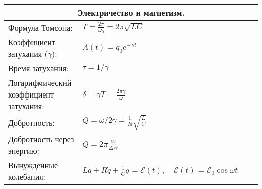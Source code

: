 \documentclass{article}
\begin{document}
\begin{tabular}{ |p{6cm}|p{3cm}|p{6cm}|p{3.5cm}|  }
\hline
\multicolumn{4}{|c|}{Электричество и магнетизм.} \\
\hline
Формула Томсона:                                                           &
$T=\frac{2 \pi}{\omega_{0}}=2 \pi \sqrt{L C}$                              &
                                                                           &
                                                                           \\
\hline
Коэффициент затухания ($\gamma$):                                          &
$A(t)=q_{0} e^{-\gamma t}$                                                 &
                                                                           &
                                                                           \\
\hline
Время затухания:                                                           &
$\tau=1 / \gamma$                                                          &
                                                                           &
                                                                           \\
\hline
Логарифмический коэффициент затухания:                                     &
$\delta=\gamma T=\frac{2 \pi \gamma}{\omega}$                              &
                                                                           &
                                                                           \\
\hline
Добротность:                                                               &
$Q=\omega / 2 \gamma = \frac{1}{R} \sqrt{\frac{L}{C}}$                     &
                                                                           &
                                                                           \\
\hline
Добротность через энергию:                                                 &
$Q=2 \pi \frac{W}{\Delta W}$                                               &
                                                                           &
                                                                           \\
\hline
Вынужденные колебания:                                                     &
$L \ddot{q}+R \dot{q}+\frac{1}{C} q=\mathcal{E}(t), \quad \mathcal{E}(t)=\mathcal{E}_{0} \cos \omega t$&
                                                                           &
                                                                           \\

\end{tabular}
\end{document}
